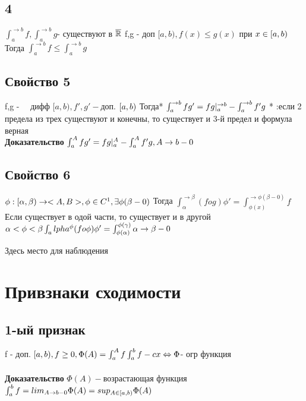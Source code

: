 \documentclass[12pt, a4paper]{article}
\begin{document}
    \subsection{4}
    $  \int_a^{\rightarrow b} f,  \int_a^{\rightarrow b} g $- существуют в $ \overline{\mathbb{R}} \\$
    f,g - доп $ [a, b), f(x) \leq  g(x) $ при  $ x \in [a,b) \\$
    Тогда $  \int_a^{\rightarrow b} f \leq  \int_a^{\rightarrow b} g  $
    \subsection{Свойство 5}
    f,g -   дифф $ [a, b), f' , g' - $доп. $ [a,b) \\$
    Тогда* $  \int_a^{\rightarrow b} f g' = f g |_a^{\rightarrow b} - \int_a^{\rightarrow b} f' g \\$
    * :если  2 предела  из трех существуют и конечны, то существует и 3-й предел  и формула верная \\
    \textbf{Доказательство}
    $  \int_a^A f g' = f g |_a^A - \int_a^A f' g , A \rightarrow b -0 \\ $
       \subsection{Свойство 6}
       $ \phi : [\alpha, \beta) \rightarrow <A,B >, \phi \in C^1,  \exists \phi (\beta - 0) \\$
       Тогда $  \int_\alpha^{\rightarrow \beta} (f o g)\phi' = \int_{\phi(x)}^{\rightarrow\phi(\beta - 0)}  f$ 	Если существует в одой части, то существует и в другой\\
       $ \alpha < \phi <  \beta \\
       \int_alpha^\phi (f o \phi) \phi' = \int_{\phi(\alpha)}^{\phi(\gamma)}\\
       \alpha \rightarrow  \beta -0 \\$
       
       Здесь место для наблюдения  \\
      \section{Привзнаки сходимости}
      \subsection{1-ый признак}
      f - доп. $ [a,b), f\geq 0, \Phi(A) =\int_a^A f\\
      \int_a^b f -cx \Leftrightarrow \Phi $- огр функция\\
      \\
      \textbf{Доказательство}
      $ \Phi(A)- $возрастающая функция \\
       $ \int_a^b f = lim_{A \rightarrow b - 0} \Phi(A)= sup_{A \in [a,b)} \Phi (A)\\$
\end{document}

